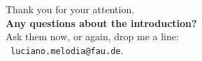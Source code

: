 \documentclass[aspectratio=169,t]{beamer}
\begin{document}
  { %
    \begin{frame}[c]
      \begin{center}
        Thank you for your attention.\\
        {\bf Any questions about the introduction?}\\[0.5cm]
        Ask them now, or again, drop me a line: \\ 
        \faSendO \ \texttt{luciano.melodia@fau.de}.
      \end{center}
    \end{frame}
  }
\end{document}
